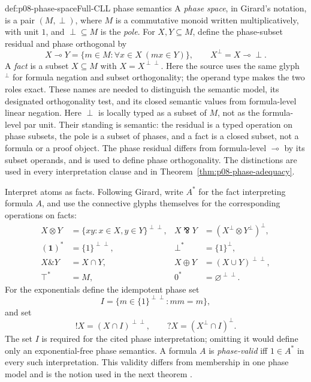 \begin{hbdefinition}{def:p08-phase-space}{Full-CLL phase semantics}
A \emph{phase space}, in Girard's notation, is a pair \((M,\perp)\), where
\(M\) is a commutative monoid written multiplicatively, with unit \(1\), and
\(\perp\subseteq M\) is the \emph{pole}.  For \(X,Y\subseteq M\), define the
phase-subset residual and phase orthogonal by
\[
 X\multimap Y
 =\{m\in M:\forall x\in X\
      (mx\in Y)\},
 \qquad
 X^{\perp}
 =X\multimap\perp.
\]
A \emph{fact} is a subset \(X\subseteq M\) with
\(X=X^{\perp\perp}\).  Here the source uses the same glyph
\({}^{\perp}\) for formula negation and subset orthogonality; the operand type
makes the two roles exact.  These names are needed
to distinguish the semantic model, its designated orthogonality test, and its
closed semantic values from formula-level linear negation.  Here \(\perp\) is
locally typed as a subset of \(M\), not as the formula-level par unit.  Their standing is
semantic: the residual is a typed operation on phase subsets, the pole is a
subset of phases, and a fact is a closed subset, not a formula or a proof
object.  The phase residual differs from formula-level \(\multimap\) by its
subset operands, and is used to define phase orthogonality.  The distinctions
are used in every interpretation clause and in
Theorem~\ref{thm:p08-phase-adequacy}.

Interpret atoms as facts.  Following Girard, write \(A^*\) for the fact
interpreting formula \(A\), and use the connective glyphs themselves for the
corresponding operations on facts:
\[
\begin{aligned}
 X\otimes Y&=\{xy:
                     x\in X, y\in Y\}^{\perp\perp},
 &X\bindnasrepma Y&=(X^\perp\otimes Y^\perp)^\perp,\\
 (\mathbf 1)^*&=\{1\}^{\perp\perp},
 &\bot^*&=\{1\}^{\perp},\\
 X\mathbin{\&}Y&=X\cap Y,
 &X\oplus Y&=(X\cup Y)^{\perp\perp},\\
 \top^*&=M,
 &0^*&=\varnothing^{\perp\perp}.
\end{aligned}
\]
For the exponentials define the idempotent phase set
\[
 I=\{m\in\{1\}^{\perp\perp}:mm=m\},
\]
and set
\[
 !X=(X\cap I)^{\perp\perp},
 \qquad
 ?X=(X^\perp\cap I)^\perp.
\]
The set \(I\) is required for the cited phase interpretation; omitting
it would define only an exponential-free phase semantics.  A formula \(A\) is
\emph{phase-valid} iff \(1\in A^*\) in every such interpretation.  This
validity differs from membership in one phase
model and is the notion used in the next theorem \cite{Girard1995}.
\index{phase semantics}
\end{hbdefinition}

